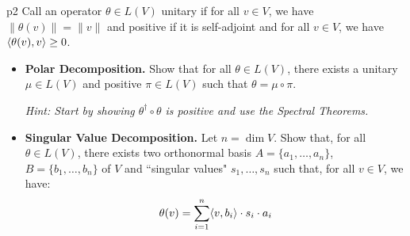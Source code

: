 \documentclass[a4paper, 11pt]{article}
\begin{document}
\begin{problem}{%
	}{p2%
	}
Call an operator $\theta\in L(V)$ unitary if for all $v\in V$, we have $\|\theta(v)\|=\|v\|$ and positive if it is self-adjoint and for all $v\in V$, we have $\langle\theta(v),v\rangle\geq 0$.\begin{itemize}[label=$\bullet$]
	\item \textbf{Polar Decomposition.} Show that for all $\theta\in L(V)$, there exists a unitary $\mu\in L(V)$ and positive $\pi\in L(V)$ such that $\theta =\mu\circ\pi$.
	
	\textit{Hint: Start by showing $\theta^{\dagger}\circ\theta$ is positive and use the Spectral Theorems.}
	\item \textbf{Singular Value Decomposition.} Let $n=\dim V$. Show that, for all $\theta\in L(V)$, there exists two orthonormal basis $A=\{a_1,\dots, a_n\}$, $B=\{b_1,\dots, b_n\}$ of $V$ and ``singular values" $s_1,\dots, s_n$ such that, for all $v\in V$, we have:$$\theta(v)=\sum_{i=1}^n \langle v,b_i\rangle\cdot s_i\cdot a_i$$ 
\end{itemize}
\end{problem}
\end{document}
